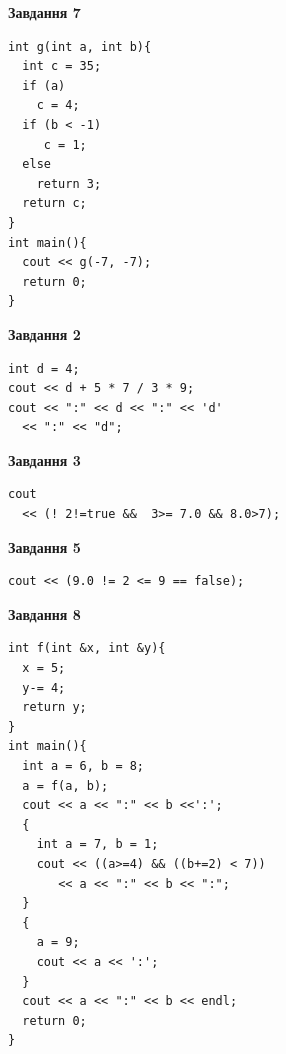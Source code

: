 \documentclass[12pt, ukrainian]{article}
\begin{document}
{\begin {large}
\begin{minipage}[t]{7.0cm}
\begin{center}
\textbf{Завдання 7}
\end{center}
\vspace{-8mm}

\begin{verbatim}
int g(int a, int b){
  int c = 35;
  if (a)
    c = 4;
  if (b < -1)
     c = 1;
  else
    return 3;
  return c;
}
int main(){
  cout << g(-7, -7);
  return 0;
}
\end{verbatim}

\end{minipage}
\vline \hspace{1mm}
\begin{minipage}[t]{11.0cm}

\begin{center}
\textbf{Завдання 2}
\end{center}
\vspace{-8mm}

\begin{verbatim}
int d = 4;
cout << d + 5 * 7 / 3 * 9;
cout << ":" << d << ":" << 'd' 
  << ":" << "d";
\end{verbatim}



\begin{center}
\textbf{Завдання 3}
\end{center}
\vspace{-8mm}

\begin{verbatim}
cout 
  << (! 2!=true &&  3>= 7.0 && 8.0>7);
\end{verbatim}



\begin{center}
\textbf{Завдання 5}
\end{center}
\vspace{-8mm}

\begin{verbatim}
cout << (9.0 != 2 <= 9 == false);
\end{verbatim}



\begin{center}
\textbf{Завдання 8}
\end{center}
\vspace{-8mm}

\begin{verbatim}
int f(int &x, int &y){
  x = 5;
  y-= 4;
  return y;
}
int main(){
  int a = 6, b = 8;
  a = f(a, b);
  cout << a << ":" << b <<':';
  {
    int a = 7, b = 1;
    cout << ((a>=4) && ((b+=2) < 7))
       << a << ":" << b << ":";
  }
  {
    a = 9;
    cout << a << ':';
  }
  cout << a << ":" << b << endl;
  return 0;
}
\end{verbatim}


\end{minipage}
\end{large}}
\end{document}
